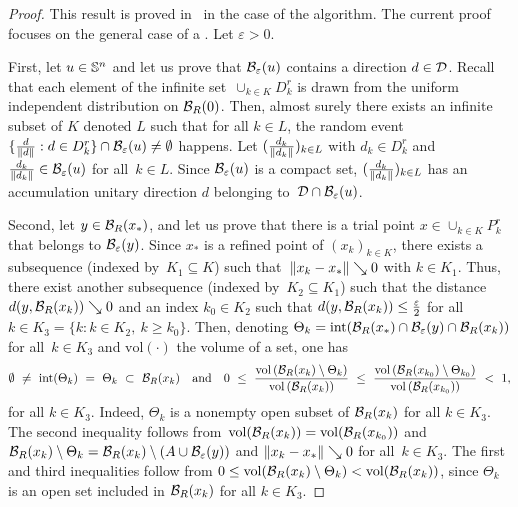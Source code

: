 \begin{proof}
	This result is proved in~\cite[Lemma~4.12]{AuBaKo22} in the case of the \mads algorithm.
	The current proof focuses on the general case of a \ddsm.
	Let $\varepsilon > 0$.
	
	First, let $u \in \S^n$ and let us prove that $\B_\varepsilon(u)$ contains a direction $d \in \D$.
	Recall that each element of the infinite set~$\cup_{k \in K} D^r_k$ is drawn from the uniform independent distribution on $\B_R(0)$.
	Then, almost surely there exists an infinite subset of $K$ denoted $L$ such that for all $k \in L$, the random event~$\{\frac{d}{\norm{d}} : d \in D^r_k\} \cap \B_\varepsilon(u) \neq \emptyset$ happens.
	Let $(\frac{d_k}{\norm{d_k}})_{k \in L}$ with $d_k \in D^r_k$ and $\frac{d_k}{\norm{d_k}} \in \B_\varepsilon(u)$ for all~$k \in L$.
	Since $\B_\varepsilon(u)$ is a compact set, $(\frac{d_k}{\norm{d_k}})_{k \in L}$ has an accumulation unitary direction $d$ belonging to~$\D \cap \B_\varepsilon(u)$.
	
	Second, let $y \in \B_R(x_*)$, and let us prove that there is a \revpoll trial point $x \in \cup_{k \in K}P^r_k$ that belongs to $\B_\varepsilon(y)$.
	Since $x_*$ is a refined point of $(x_k)_{k \in K}$, there exists a subsequence (indexed by~$K_1 \subseteq K$) such that~$\norm{x_k-x_*} \searrow 0$ with $k \in K_1$.
	Thus, there exist another subsequence (indexed by~$K_2 \subseteq K_1$) such that the distance~$d(y, \B_R(x_k)) \searrow 0$ and an index $k_0 \in K_2$ such that $d(y, \B_R(x_k)) \leq \frac{\varepsilon}{2}$ for all $k \in K_3 = \{k : k \in K_2,~ k \geq k_0\}$.
	Then, denoting $\Theta_k = \int(\B_R(x_*) \cap \B_\varepsilon(y) \cap \B_R(x_k))$ for all~$k \in K_3$ and $\mathrm{vol}(\cdot)$ the volume of a set, one has
	\begin{equation*}
		\emptyset \ \neq \ \int(\Theta_k) \ = \  \Theta_k \ \subset \  \B_R(x_k)
		\quad \mbox{and} \quad
		0 \ \leq \ 
		\dfrac
		{\mathrm{vol}\left(\B_R(x_k)\setminus\Theta_k\right)}
		{\mathrm{vol}\left(\B_R(x_k)\right)}
		\ \leq \ 
		\dfrac
		{\mathrm{vol}\left(\B_R(x_{k_0})\setminus\Theta_{k_0}\right)}
		{\mathrm{vol}\left(\B_R(x_{k_0})\right)}
		\ < \ 1,
	\end{equation*}
	for all $k \in K_3$.
	Indeed, $\Theta_k$ is a nonempty open subset of $\B_R(x_k)$ for all $k \in K_3$.
    The second inequality follows from~$\mathrm{vol}(\B_R(x_k)) = \mathrm{vol}(\B_R(x_{k_0}))$ and $\B_R(x_k)\setminus\Theta_k = \B_R(x_k)\setminus(A\cup\B_\varepsilon(y))$ and $\norm{x_k-x_*} \searrow 0$ for all~$k \in K_3$.
	The first and third inequalities follow from $0 \leq \mathrm{vol}(\B_R(x_k)\setminus\Theta_k) < \mathrm{vol}(\B_R(x_k))$, since $\Theta_k$ is an open set included in $\B_R(x_k)$ for all $k \in K_3$.
	

\end{proof}
